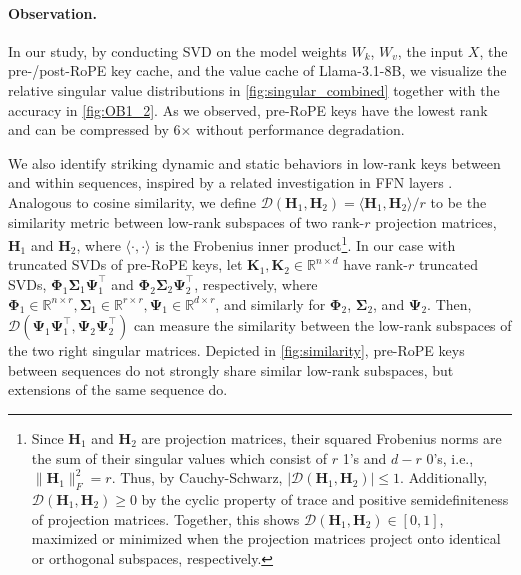 \paragraph{Observation.} In our study, by conducting SVD on the model weights $W_k$, $W_v$, the input $X$, the pre-/post-RoPE key cache, and the value cache of Llama-3.1-8B, we visualize the relative singular value distributions in \cref{fig:singular_combined} together with the accuracy in \cref{fig:OB1_2}. As we observed, pre-RoPE keys have the lowest rank and can be compressed by 6$\times$ without performance degradation. 

We also identify striking dynamic and static behaviors in low-rank keys between and within sequences, inspired by a related investigation in FFN layers \citep{dong2024prompt}. Analogous to cosine similarity, we define $\mathcal{D}(\boldsymbol{H}_1, \boldsymbol{H}_2) = \langle \boldsymbol{H}_1, \boldsymbol{H}_2 \rangle /r$ to be the similarity metric between low-rank subspaces of two rank-$r$ projection matrices, $\boldsymbol{H}_1$ and $\boldsymbol{H}_2$, where $\langle \cdot, \cdot \rangle$ is the Frobenius inner product\footnote{Since $\boldsymbol{H}_1$ and $\boldsymbol{H}_2$ are projection matrices, their squared Frobenius norms are the sum of their singular values which consist of $r$ 1's and $d-r$ 0's, i.e., $\|\boldsymbol{H}_1 \|^2_F = r$. Thus, by Cauchy-Schwarz, $|\mathcal{D}(\boldsymbol{H}_1, \boldsymbol{H}_2)| \leq 1$. Additionally, $\mathcal{D}(\boldsymbol{H}_1, \boldsymbol{H}_2) \geq 0$ by the cyclic property of trace and positive semidefiniteness of projection matrices. Together, this shows $\mathcal{D}(\boldsymbol{H}_1, \boldsymbol{H}_2) \in [0,1]$, maximized or minimized when the projection matrices project onto identical or orthogonal subspaces, respectively.}. In our case with truncated SVDs of pre-RoPE keys, let $\boldsymbol{K}_1, \boldsymbol{K}_2 \in \mathbb{R}^{n \times d}$ have rank-$r$ truncated SVDs, $\boldsymbol{\Phi}_1 \boldsymbol{\Sigma}_1 \boldsymbol{\Psi}^\top_1$ and $\boldsymbol{\Phi}_2 \boldsymbol{\Sigma}_2 \boldsymbol{\Psi}^\top_2$, respectively, where $\boldsymbol{\Phi}_1 \in \mathbb{R}^{n \times r}, \boldsymbol{\Sigma}_1 \in \mathbb{R}^{r \times r}, \boldsymbol{\Psi}_1 \in \mathbb{R}^{d \times r}$, and similarly for $\boldsymbol{\Phi}_2$, $\boldsymbol{\Sigma}_2$, and $\boldsymbol{\Psi}_2$. Then, $\mathcal{D}(\boldsymbol{\Psi}_1 \boldsymbol{\Psi}_1^\top, \boldsymbol{\Psi}_2 \boldsymbol{\Psi}_2^\top)$ can measure the similarity between the low-rank subspaces of the two right singular matrices. Depicted in \cref{fig:similarity}, pre-RoPE keys between sequences do not strongly share similar low-rank subspaces, but extensions of the same sequence do.

